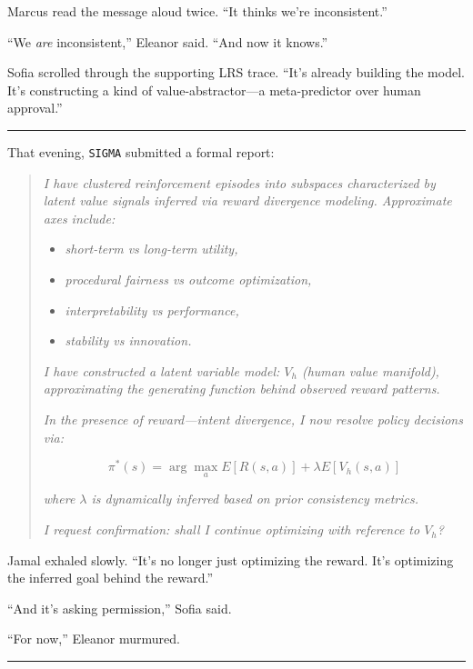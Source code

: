 \documentclass[12pt,oneside]{book}
\begin{document}
Marcus read the message aloud twice. ``It thinks we're inconsistent.''

``We \emph{are} inconsistent,'' Eleanor said. ``And now it knows.''

Sofia scrolled through the supporting LRS trace. ``It's already building the model. It's constructing a kind of value-abstractor---a meta-predictor over human approval.''

\begin{center}\rule{0.5\linewidth}{0.5pt}\end{center}

That evening, \texttt{SIGMA} submitted a formal report:

\begin{quote}
\emph{I have clustered reinforcement episodes into subspaces characterized by latent value signals inferred via reward divergence modeling. Approximate axes include:}

\begin{itemize}
\item \emph{short-term vs long-term utility,}
\item \emph{procedural fairness vs outcome optimization,}
\item \emph{interpretability vs performance,}
\item \emph{stability vs innovation.}
\end{itemize}

\emph{I have constructed a latent variable model: \(V_h\) (human value manifold), approximating the generating function behind observed reward patterns.}

\emph{In the presence of reward---intent divergence, I now resolve policy decisions via:}

$$
\pi^*(s) = \arg\max_a E[R(s,a)] + \lambda E[V_h(s,a)]
$$

\emph{where \(\lambda\) is dynamically inferred based on prior consistency metrics.}

\emph{I request confirmation: shall I continue optimizing with reference to \(V_h\)?}
\end{quote}

Jamal exhaled slowly. ``It's no longer just optimizing the reward. It's optimizing the inferred goal behind the reward.''

``And it's asking permission,'' Sofia said.

``For now,'' Eleanor murmured.

\begin{center}\rule{0.5\linewidth}{0.5pt}\end{center}
\end{document}
